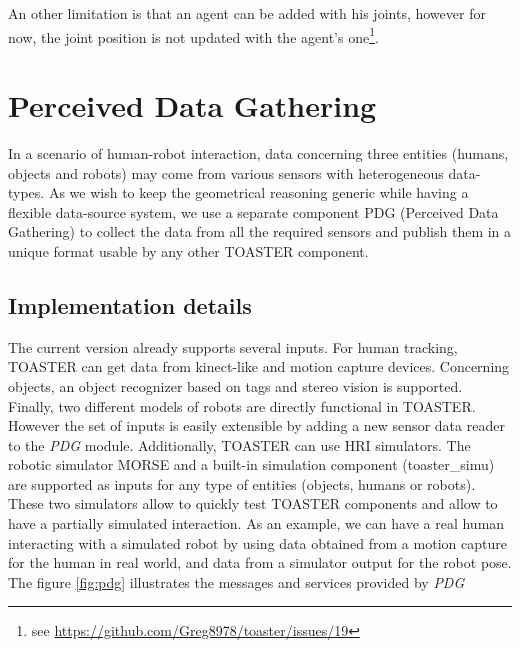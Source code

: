 \documentclass[a4paper]{article}
\begin{document}
An other limitation is that an agent can be added with his joints, however for now, the joint position is not updated with the agent's one\footnote{see \url{https://github.com/Greg8978/toaster/issues/19}}.


\section{Perceived Data Gathering}
In a scenario of human-robot interaction, data concerning three entities (humans, objects and robots) may come from various sensors with heterogeneous data-types. As we wish to keep the geometrical reasoning generic while having a flexible data-source system, we use a separate component PDG (Perceived Data Gathering) to collect the data from all the required sensors and publish them in a unique format usable by any other TOASTER component.






\subsection{Implementation details}
The current version already supports several inputs. For human tracking, TOASTER can get data from kinect-like and motion capture devices. Concerning objects, an object recognizer based on tags and stereo vision is supported. Finally, two different models of robots are directly functional in TOASTER. However the set of inputs is easily extensible by adding a new sensor data reader to the \textit{PDG} module. Additionally, TOASTER can use HRI simulators. The robotic simulator MORSE\cite{simpar_2014} \cite{lemaignan2014simulation} and a built-in simulation component (toaster\_simu) are supported as inputs for any type of entities (objects, humans or robots). These two simulators allow to quickly test TOASTER components and allow to have a partially simulated interaction. As an example, we can have a real human interacting with a simulated robot by using data obtained from a motion capture for the human in real world, and data from a simulator output for the robot pose. The figure \ref{fig:pdg} illustrates the messages and services provided by \textit{PDG}
\end{document}
